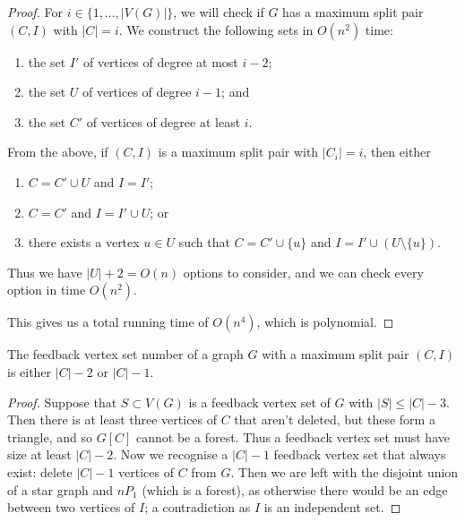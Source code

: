 \begin{solution}
\begin{proof}
        For $i \in \{1, \ldots, \lvert V(G) \rvert\}$, we will check if $G$ has a maximum split pair $(C, I)$ with $\lvert C \rvert = i$. We construct the following sets in $O(n^2)$ time:
        \begin{enumerate}
            \item the set $I'$ of vertices of degree at most $i-2$;
            \item the set $U$ of vertices of degree $i-1$; and
            \item the set $C'$ of vertices of degree at least $i$.
        \end{enumerate}
        From the above, if $(C, I)$ is a maximum split pair with $\lvert C_i \rvert = i$, then either
        \begin{enumerate}
            \item $C = C' \cup U$ and $I  = I'$;
            \item $C = C'$ and $I = I' \cup U$; or
            \item there exists a vertex $u \in U$ such that $C = C' \cup \{u\}$ and $I = I' \cup (U \setminus \{u\})$.
        \end{enumerate}
        Thus we have $\lvert U \rvert + 2 = O(n)$ options to consider, and we can check every option in time $O(n^2)$.

        This gives us a total running time of $O(n^4)$, which is polynomial.
    \end{proof}
    \vspace{1em}

    \begin{lemma}
        The feedback vertex set number of a graph $G$ with a maximum split pair $(C, I)$ is either $\lvert C \rvert - 2$ or $\lvert C \rvert - 1$.
    \end{lemma}

    \begin{proof}
        Suppose that $S \subset V(G)$ is a feedback vertex set of $G$ with $\lvert S \rvert \leq \lvert C \rvert - 3$. Then there is at least three vertices of $C$ that aren't deleted, but these form a triangle, and so $G[C]$ cannot be a forest. Thus a feedback vertex set must have size at least $\lvert C \rvert - 2$. Now we recognise a $\lvert C \rvert - 1$ feedback vertex set that always exist: delete $\lvert C \rvert - 1$ vertices of $C$ from $G$. Then we are left with the disjoint union of a star graph and $nP_1$ (which is a forest), as otherwise there would be an edge between two vertices of $I$; a contradiction as $I$ is an independent set.
    \end{proof}


\end{solution}
